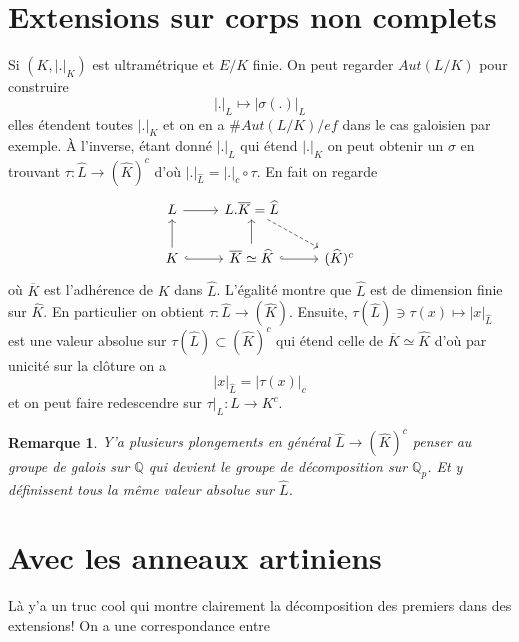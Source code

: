 \documentclass[a4paper,12pt]{book}
\newcommand{\Q}{\mathbb{Q}}
\theoremstyle{plain}
\newtheorem{rem}{Remarque}
\theoremstyle{definition}
\theoremstyle{remark}
\begin{document}
\section{Extensions sur corps non complets}
Si $(K, |.|_K)$ est ultramétrique et $E/K$ finie. On peut regarder
$Aut(L/K)$ pour construire
\[|.|_L\mapsto |\sigma(.)|_L\]
elles étendent toutes $|.|_K$ et on en a $\#Aut(L/K)/ef$ dans le cas
galoisien par exemple. À l'inverse, 
étant donné $|.|_L$ qui étend $|.|_K$ on peut obtenir un $\sigma$ en
trouvant $\tau\colon \widehat L\to (\widehat{K})^c$ d'où
$|.|_{\widehat L}= |.|_c\circ\tau$. En fait on regarde 
\[\begin{tikzcd}
	L & {L.\overline K=\widehat L} \\
	K & {\overline K\simeq \widehat K} & {(\widehat K)^c}
	\arrow[from=1-1, to=1-2]
	\arrow[dashed, from=1-2, to=2-3]
	\arrow[from=2-1, to=1-1]
	\arrow[hook, from=2-1, to=2-2]
	\arrow[from=2-2, to=1-2]
	\arrow[hook, from=2-2, to=2-3]
\end{tikzcd}\]
où $\overline K$ est l'adhérence de $K$ dans $\widehat L$. L'égalité
montre que $\widehat L$ est de dimension finie sur $\widehat K$. En
particulier on obtient $\tau \colon \widehat L\to (\widehat K)$. Ensuite,
$\tau(\widehat L)\ni\tau(x)\mapsto |x|_{\widehat L}$ est une valeur 
absolue sur $\tau(\widehat L)\subset (\widehat K)^c$ qui étend celle
de $\overline K\simeq \widehat K$ d'où par unicité sur la clôture on a
\[|x|_{\widehat L}=|\tau(x)|_c\]
et on peut faire redescendre sur $\tau|_L\colon L\to K^c$. 
\begin{rem}
    Y'a plusieurs plongements en général $\widehat L \to (\widehat K)^c$
    penser au groupe de galois sur $\Q$ qui devient le groupe de 
    décomposition sur $\Q_p$. Et y définissent tous la même valeur
    absolue sur $\widehat L$.
\end{rem}
\section{Avec les anneaux artiniens}
Là y'a un truc cool qui montre clairement la décomposition des premiers
dans des extensions! On a une correspondance entre 
\end{document}
